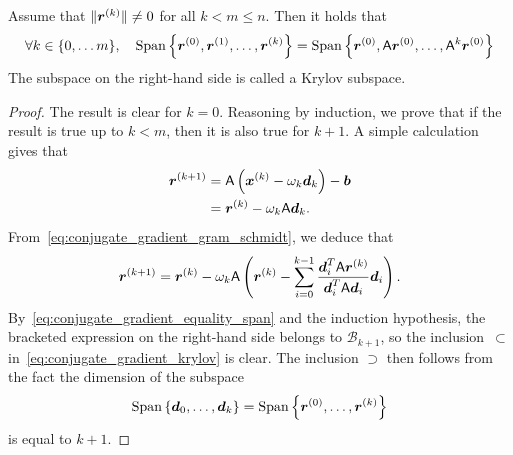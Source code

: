 \begin{proposition}
    \label{proposition:krylov_subspace}
    Assume that $\lVert\mathbf{\boldsymbol{r}}^{(k)}\rVert \neq 0$ for all $k < m \leq n$.
    Then it holds that
    \begin{equation}
        \label{eq:conjugate_gradient_krylov}
        \forall k \in \{0, \dotsc m\}, \quad
        \operatorname{Span}\left\{ \mathbf{\boldsymbol{r}}^{(0)}, \mathbf{\boldsymbol{r}}^{(1)}, \dotsc, \mathbf{\boldsymbol{r}}^{(k)} \right\}
        = \operatorname{Span}\left\{ \mathbf{\boldsymbol{r}}^{(0)}, \mathsf A \mathbf{\boldsymbol{r}}^{(0)}, \dotsc, \mathsf A^k \mathbf{\boldsymbol{r}}^{(0)} \right\}
    \end{equation}
    The subspace on the right-hand side is called a Krylov subspace.
\end{proposition}
\begin{proof}
    The result is clear for $k = 0$.
    Reasoning by induction,
    we prove that if the result is true up to $k < m$,
    then it is also true for $k+1$.
    A simple calculation gives that
    \begin{align}
        \nonumber
        \mathbf{\boldsymbol{r}}^{(k+1)}
        &= \mathsf A \left( \mathbf{\boldsymbol{x}}^{(k)} - \omega_k \mathbf{\boldsymbol{d}}_k \right)  - \mathbf{\boldsymbol{b}}  \\
        \label{eq:residual_iteration}
        &= \mathbf{\boldsymbol{r}}^{(k)} - \omega_k \mathsf A \mathbf{\boldsymbol{d}}_k.
    \end{align}
    From~\eqref{eq:conjugate_gradient_gram_schmidt},
    we deduce that
    \[
        \mathbf{\boldsymbol{r}}^{(k+1)}
        = \mathbf{\boldsymbol{r}}^{(k)} - \omega_k \mathsf A \left( \mathbf{\boldsymbol{r}}^{(k)} - \sum_{i=0}^{k-1} \frac{\mathbf{\boldsymbol{d}}_i^T \mathsf A \mathbf{\boldsymbol{r}}^{(k)}}{\mathbf{\boldsymbol{d}}_i^T \mathsf A \mathbf{\boldsymbol{d}}_i} \mathbf{\boldsymbol{d}}_i \right).
    \]
     By~\eqref{eq:conjugate_gradient_equality_span} and the induction hypothesis, 
    the bracketed expression on the right-hand side belongs to $\mathcal B_{k+1}$,
    so the inclusion~$\subset$ in~\eqref{eq:conjugate_gradient_krylov} is clear.
    The inclusion $\supset$ then follows from the fact the dimension of the subspace
    \[
        \operatorname{Span}\left\{ \mathbf{\boldsymbol{d}}_0, \dotsc, \mathbf{\boldsymbol{d}}_{k} \right\} =
        \operatorname{Span}\left\{ \mathbf{\boldsymbol{r}}^{(0)}, \dotsc, \mathbf{\boldsymbol{r}}^{(k)} \right\}
    \]
    is equal to $k+1$.
\end{proof}

